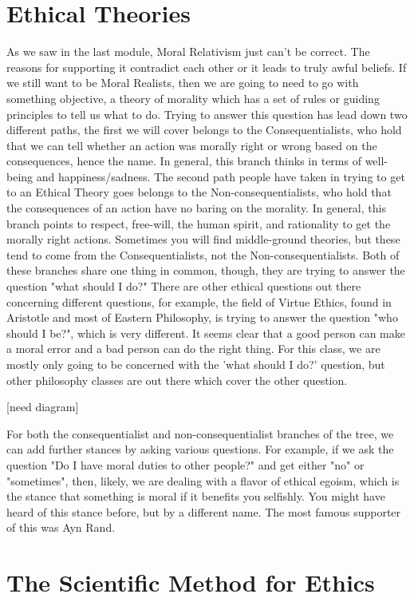 \section{Ethical Theories}
As we saw in the last module, Moral Relativism just can't be correct. The reasons for supporting it contradict each other or it leads to truly awful beliefs. If we still want to be Moral Realists, then we are going to need to go with something objective, a theory of morality which has a set of rules or guiding principles to tell us what to do.  Trying to answer this question has lead down two different paths, the first we will cover belongs to the Consequentialists, who hold that we can tell whether an action was morally right or wrong based on the consequences, hence the name. In general, this branch thinks in terms of well-being and happiness/sadness. The second path people have taken in trying to get to an Ethical Theory goes belongs to the Non-consequentialists, who hold that the consequences of an action have no baring on the morality. In general, this branch points to respect, free-will, the human spirit, and rationality to get the morally right actions. Sometimes you will find middle-ground theories, but these tend to come from the Consequentialists, not the Non-consequentialists. Both of these branches share one thing in common, though, they are trying to answer the question "what should I do?" There are other ethical questions out there concerning different questions, for example, the field of Virtue Ethics, found in Aristotle and most of Eastern Philosophy, is trying to answer the question "who should I be?", which is very different. It seems clear that a good person can make a moral error and a bad person can do the right thing.  For this class, we are mostly only going to be concerned with the 'what should I do?' question, but other philosophy classes are out there which cover the other question.

[need diagram]

For both the consequentialist and non-consequentialist branches of the tree, we can add further stances by asking various questions. For example, if we ask the question "Do I have moral duties to other people?" and get either "no" or "sometimes", then, likely, we are dealing with a flavor of ethical egoism, which is the stance that something is moral if it benefits you selfishly. You might have heard of this stance before, but by a different name. The most famous supporter of this was Ayn Rand.

\section{The Scientific Method for Ethics}

